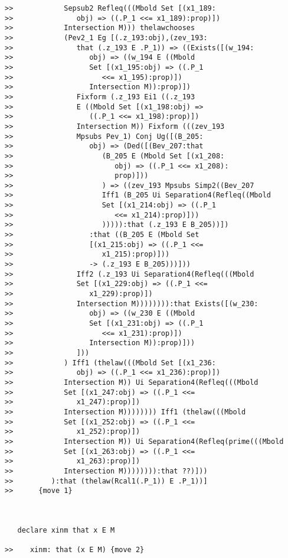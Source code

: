 \documentclass[12pt]{article}
\begin{document}
\begin{verbatim}
>>            Sepsub2 Refleq(((Mbold Set [(x1_189:
>>               obj) => ((.P_1 <<= x1_189):prop)])
>>            Intersection M))) thelawchooses
>>            (Pev2_1 Eg [(.z_193:obj),(zev_193:
>>               that (.z_193 E .P_1)) => ((Exists([(w_194:
>>                  obj) => ((w_194 E ((Mbold
>>                  Set [(x1_195:obj) => ((.P_1
>>                     <<= x1_195):prop)])
>>                  Intersection M)):prop)])
>>               Fixform (.z_193 Ei1 ((.z_193
>>               E ((Mbold Set [(x1_198:obj) =>
>>                  ((.P_1 <<= x1_198):prop)])
>>               Intersection M)) Fixform (((zev_193
>>               Mpsubs Pev_1) Conj Ug([(B_205:
>>                  obj) => (Ded([(Bev_207:that
>>                     (B_205 E (Mbold Set [(x1_208:
>>                        obj) => ((.P_1 <<= x1_208):
>>                        prop)]))
>>                     ) => ((zev_193 Mpsubs Simp2((Bev_207
>>                     Iff1 (B_205 Ui Separation4(Refleq((Mbold
>>                     Set [(x1_214:obj) => ((.P_1
>>                        <<= x1_214):prop)]))
>>                     ))))):that (.z_193 E B_205))])
>>                  :that ((B_205 E (Mbold Set
>>                  [(x1_215:obj) => ((.P_1 <<=
>>                     x1_215):prop)]))
>>                  -> (.z_193 E B_205)))]))
>>               Iff2 (.z_193 Ui Separation4(Refleq(((Mbold
>>               Set [(x1_229:obj) => ((.P_1 <<=
>>                  x1_229):prop)])
>>               Intersection M)))))))):that Exists([(w_230:
>>                  obj) => ((w_230 E ((Mbold
>>                  Set [(x1_231:obj) => ((.P_1
>>                     <<= x1_231):prop)])
>>                  Intersection M)):prop)]))
>>               ]))
>>            ) Iff1 (thelaw(((Mbold Set [(x1_236:
>>               obj) => ((.P_1 <<= x1_236):prop)])
>>            Intersection M)) Ui Separation4(Refleq(((Mbold
>>            Set [(x1_247:obj) => ((.P_1 <<=
>>               x1_247):prop)])
>>            Intersection M)))))))) Iff1 (thelaw(((Mbold
>>            Set [(x1_252:obj) => ((.P_1 <<=
>>               x1_252):prop)])
>>            Intersection M)) Ui Separation4(Refleq(prime(((Mbold
>>            Set [(x1_263:obj) => ((.P_1 <<=
>>               x1_263):prop)])
>>            Intersection M)))))))):that ??)]))
>>         ):that (thelaw(Rcal1(.P_1)) E .P_1))]
>>      {move 1}



   declare xinm that x E M

>>    xinm: that (x E M) {move 2}




\end{verbatim}
\end{document}
